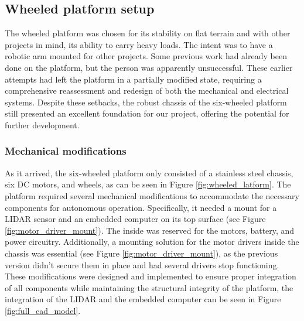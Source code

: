 \documentclass[12pt]{article}
\begin{document}

    \subsection{Wheeled platform setup}

        The wheeled platform was chosen for its stability on flat terrain and with other projects in mind, its ability to carry heavy loads. The intent was to have a robotic arm mounted for other projects. Some previous work had already been done on the platform, but the person was apparently unsuccessful. These earlier attempts had left the platform in a partially modified state, requiring a comprehensive reassessment and redesign of both the mechanical and electrical systems. Despite these setbacks, the robust chassis of the six-wheeled platform still presented an excellent foundation for our project, offering the potential for further development.

        \subsubsection{Mechanical modifications}
        As it arrived, the six-wheeled platform only consisted of a stainless steel chassis, six DC motors, and wheels, as can be seen in Figure \ref{fig:wheeled_latform}. The platform required several mechanical modifications to accommodate the necessary components for autonomous operation. Specifically, it needed a mount for a LIDAR sensor and an embedded computer on its top surface (see Figure \ref{fig:motor_driver_mount}). The inside was reserved for the motors, battery, and power circuitry. Additionally, a mounting solution for the motor drivers inside the chassis was essential (see Figure \ref{fig:motor_driver_mount}), as the previous version didn't secure them in place and had several drivers stop functioning. These modifications were designed and implemented to ensure proper integration of all components while maintaining the structural integrity of the platform, the integration of the LIDAR and the embedded computer can be seen in Figure \ref{fig:full_cad_model}.
        
\end{document}
